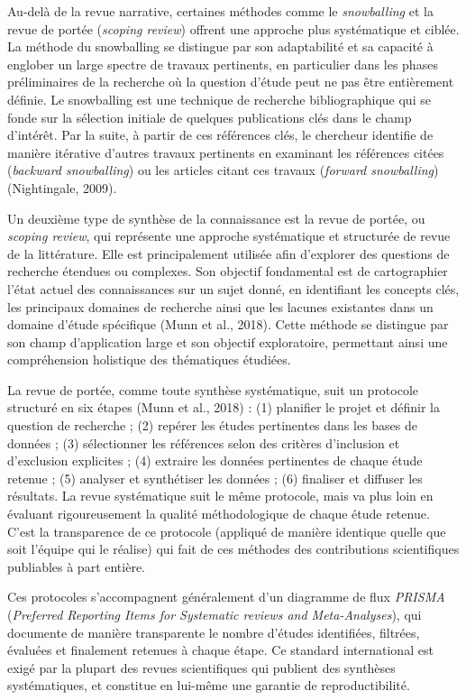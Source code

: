 \documentclass[
  letterpaper,
  DIV=11,
  numbers=noendperiod,
  oneside]{scrreprt}
\begin{document}
Au-delà de la revue narrative, certaines méthodes comme le
\emph{snowballing} et la revue de portée (\emph{scoping review}) offrent
une approche plus systématique et ciblée. La méthode du snowballing se
distingue par son adaptabilité et sa capacité à englober un large
spectre de travaux pertinents, en particulier dans les phases
préliminaires de la recherche où la question d'étude peut ne pas être
entièrement définie. Le snowballing est une technique de recherche
bibliographique qui se fonde sur la sélection initiale de quelques
publications clés dans le champ d'intérêt. Par la suite, à partir de ces
références clés, le chercheur identifie de manière itérative d'autres
travaux pertinents en examinant les références citées (\emph{backward
snowballing}) ou les articles citant ces travaux (\emph{forward
snowballing}) (Nightingale, 2009).

Un deuxième type de synthèse de la connaissance est la revue de portée,
ou \emph{scoping review}, qui représente une approche systématique et
structurée de revue de la littérature. Elle est principalement utilisée
afin d'explorer des questions de recherche étendues ou complexes. Son
objectif fondamental est de cartographier l'état actuel des
connaissances sur un sujet donné, en identifiant les concepts clés, les
principaux domaines de recherche ainsi que les lacunes existantes dans
un domaine d'étude spécifique (Munn et al., 2018). Cette méthode se
distingue par son champ d'application large et son objectif
exploratoire, permettant ainsi une compréhension holistique des
thématiques étudiées.

La revue de portée, comme toute synthèse systématique, suit un protocole
structuré en six étapes (Munn et al., 2018) : (1) planifier le projet et
définir la question de recherche ; (2) repérer les études pertinentes
dans les bases de données ; (3) sélectionner les références selon des
critères d'inclusion et d'exclusion explicites ; (4) extraire les
données pertinentes de chaque étude retenue ; (5) analyser et
synthétiser les données ; (6) finaliser et diffuser les résultats. La
revue systématique suit le même protocole, mais va plus loin en évaluant
rigoureusement la qualité méthodologique de chaque étude retenue. C'est
la transparence de ce protocole (appliqué de manière identique quelle
que soit l'équipe qui le réalise) qui fait de ces méthodes des
contributions scientifiques publiables à part entière.

Ces protocoles s'accompagnent généralement d'un diagramme de flux
\emph{PRISMA} (\emph{Preferred Reporting Items for Systematic reviews
and Meta-Analyses}), qui documente de manière transparente le nombre
d'études identifiées, filtrées, évaluées et finalement retenues à chaque
étape. Ce standard international est exigé par la plupart des revues
scientifiques qui publient des synthèses systématiques, et constitue en
lui-même une garantie de reproductibilité.
\end{document}
